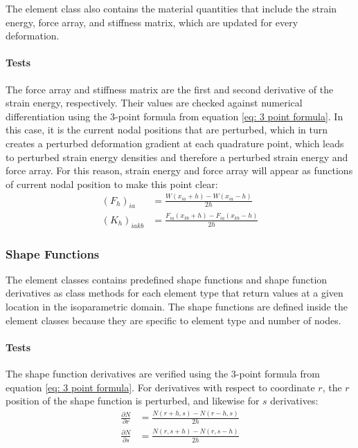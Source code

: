 \documentclass[]{spie}  %
\begin{document}
The element class also contains the material quantities that include the strain energy, force array, and stiffness matrix, which are updated for every deformation. 

\paragraph{Tests}
The force array and stiffness matrix are the first and second derivative of the strain energy, respectively. Their values are checked against numerical differentiation using the 3-point formula from equation \ref{eq: 3 point formula}. In this case, it is the current nodal positions that are perturbed, which in turn creates a perturbed deformation gradient at each quadrature point, which leads to perturbed strain energy densities and therefore a perturbed strain energy and force array. For this reason, strain energy and force array will appear as functions of current nodal position to make this point clear:
\begin{align}
(F_h)_{ia} &= \frac{W(x_{ia} + h) - W(x_{ia} - h)}{2h} \\[1ex]
(K_h)_{iakb} &= \frac{F_{ia}(x_{kb} + h) - F_{ia}(x_{kb} - h)}{2h}
\end{align}

\subsubsection{Shape Functions}
The element classes contains predefined shape functions and shape function derivatives as class methods for each element type that return values at a given location in the isoparametric domain. The shape functions are defined inside the element classes because they are specific to element type and number of nodes.

\paragraph{Tests}
The shape function derivatives are verified using the 3-point formula from equation \ref{eq: 3 point formula}. For derivatives with respect to coordinate $r$, the $r$ position of the shape function is perturbed, and likewise for $s$ derivatives:
\begin{align}
\frac{\partial N}{\partial r} &= \frac{N(r + h, s) - N(r - h, s)}{2h} \\[1ex]
\frac{\partial N}{\partial s} &= \frac{N(r, s + h) - N(r, s - h)}{2h}
\end{align}
\end{document}
